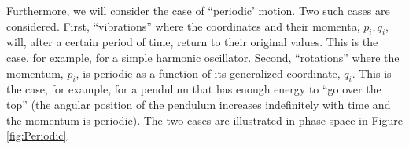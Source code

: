 Furthermore, we will consider the case of ``periodic' motion. Two such cases are considered. First, ``vibrations'' where the coordinates and their momenta, $p_i,q_i$, will, after a certain period of time, return to their original values. This is the case, for example, for a simple harmonic oscillator. Second, ``rotations'' where the momentum, $p_i$, is periodic as a function of its generalized coordinate, $q_i$. This is the case, for example, for a pendulum that has enough energy to ``go over the top'' (the angular position of the pendulum increases indefinitely with time and the momentum is periodic). The two cases are illustrated in phase space in Figure \ref{fig:Periodic}.


